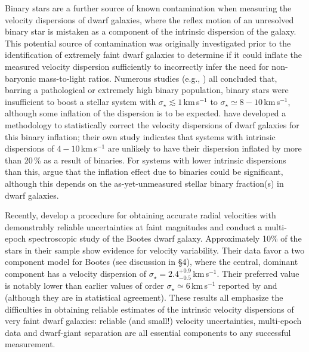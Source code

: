 \documentclass[manuscript]{aastex}
\begin{document}
Binary stars are a further source of known contamination when
measuring the velocity dispersions of dwarf galaxies, where the reflex
motion of an unresolved binary star is mistaken as a component of the
intrinsic dispersion of the galaxy. This potential source of
contamination was originally investigated prior to the identification
of extremely faint dwarf galaxies to determine if it could inflate the
measured velocity dispersion sufficiently to incorrectly infer the
need for non-baryonic mass-to-light ratios. Numerous studies (e.g.,
\citealt{aaronson1987,mateo1993,olszewski1996,hargreaves1996}) all
concluded that, barring a pathological or extremely high binary population,
binary stars were insufficient to boost a stellar system with
$\sigma_\star \lesssim1$\,km\,s$^{-1}$ to $\sigma_\star \simeq 8 -
10$\,km\,s$^{-1}$, although some inflation of the dispersion is to be
expected. \cite{minor2010} have developed a methodology to
statistically correct the velocity dispersions of dwarf galaxies for this
binary inflation; their own study indicates that systems with intrinsic dispersions
of $4 - 10$\,km\,s$^{-1}$ are unlikely to have their dispersion inflated
by more than 20\,\% as a result of binaries. For systems with lower
intrinsic dispersions than this, \cite{mcconnachie2010a}
argue that the inflation effect due to binaries could be significant,
although this depends on the as-yet-unmeasured stellar binary fraction(s)
in dwarf galaxies. 

Recently, \cite{koposov2011} develop a procedure for obtaining
accurate radial velocities with demonstrably reliable uncertainties at
faint magnitudes and conduct a multi-epoch spectroscopic study of the
Bootes dwarf galaxy. Approximately 10\% of the stars in their sample
show evidence for velocity variability. Their data favor a two
component model for Bootes (see discussion in \S4), where the central, dominant
component has a velocity dispersion of $\sigma_\star =
2.4^{+0.9}_{-0.5}$\,km\,s$^{-1}$. Their preferred value is notably
lower than earlier values of order $\sigma_\star \simeq
6$\,km\,s$^{-1}$ reported by \cite{munoz2006b} and \cite{martin2007b}
(although they are in statistical agreement).  These results all
emphasize the difficulties in obtaining reliable estimates of the
intrinsic velocity dispersions of very faint dwarf galaxies: reliable
(and small!) velocity uncertainties, multi-epoch data and dwarf-giant
separation are all essential components to any successful measurement.
\end{document}
